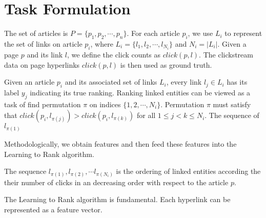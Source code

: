 \section {Task Formulation}

The set of articles is $P = \{p_1, p_2, \cdots, p_n\}$. For each article $p_i$, we use $L_i$ to represent the set of links on article $p_i$, where $L_i = \{l_1, l_2, \cdots, l_{N_i}\}$ and $N_i = |L_i|$. Given a page $p$ and its link $l$, we define the click counts as $click(p, l)$. The clickstream data on page hyperlinks $click(p, l)$ is then used as ground truth. 

Given an article $p_i$ and its associated set of links $L_i$, every link $l_j \in L_i$ has its label $y_j$ indicating its true ranking. Ranking linked entities can be viewed as a task of find permutation $\pi$ on indices $\{1,2,\cdots,N_i\}$. Permutation $\pi$ must satisfy that $click(p_i,l_{\pi(j)}) > click(p_i,l_{\pi(k)}) $ for all $1 \leq j < k \leq N_i$. The sequence of $l_{\pi(1)}$

Methodologically, we obtain features and then feed these features into the Learning to Rank algorithm.

The sequence $l_{\pi(1)}, l_{\pi(2)}, \cdots l_{\pi(N_i)}$ is the ordering of linked entities according the their number of clicks in an decreasing order with respect to the article $p$.

The Learning to Rank algorithm is fundamental. Each hyperlink can be represented as a feature vector.